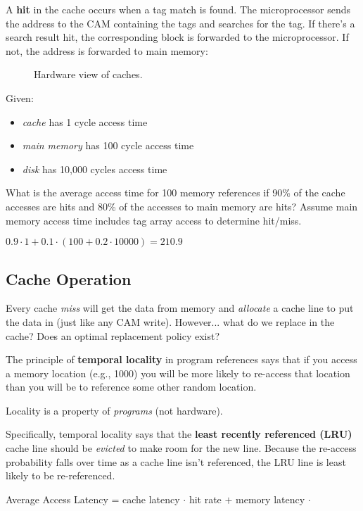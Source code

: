 A \textbf{hit} in the cache occurs when a tag match is found. The microprocessor sends the address to the CAM containing the tags and searches for the tag. If there's a search result hit, the corresponding block is forwarded to the microprocessor. If not, the address is forwarded to main memory:

\begin{figure}[h]
	\centering
	\caption{Hardware view of caches.}
	\label{fig:hardware-cache}
\end{figure}

\begin{problem}
	Given:
	\begin{itemize}
		\item \emph{cache} has 1 cycle access time
		\item \emph{main memory} has 100 cycle access time
		\item \emph{disk} has 10,000 cycles access time
	\end{itemize}
	What is the average access time for 100 memory references if 90\% of the cache accesses are hits and 80\% of the accesses to main memory are hits? Assume main memory access time includes tag array access to determine hit/miss.
\end{problem}
\begin{answer}
	\(0.9 \cdot 1 + 0.1 \cdot (100 + 0.2 \cdot 10000) = 210.9\) 
\end{answer}

\subsection{Cache Operation}
Every cache \emph{miss} will get the data from memory and \emph{allocate} a cache line to put the data in (just like any CAM write). However... what do we replace in the cache? Does an optimal replacement policy exist?

\begin{definition}
	The principle of \textbf{temporal locality} in program references says that if you access a memory location (e.g., 1000) you will be more likely to re-access that location than you will be to reference some other random location.
\end{definition}

\begin{remark}
	Locality is a property of \emph{programs} (not hardware).
\end{remark}

Specifically, temporal locality says that the \textbf{least recently referenced (LRU)} cache line should be \emph{evicted} to make room for the new line. Because the re-access probability falls over time as a cache line isn't referenced, the LRU line is least likely to be re-referenced.

\begin{definition}
	Average Access Latency = cache latency \(\cdot\) hit rate \(+\) memory latency \(\cdot\)
\end{definition}

